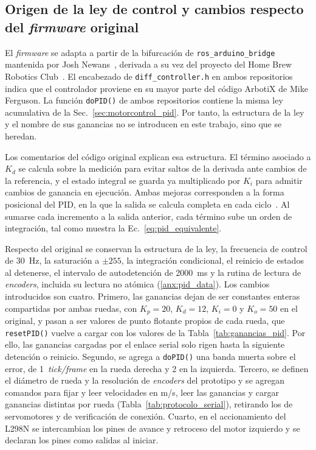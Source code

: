 \begin{appendices}
\subsection{Origen de la ley de control y cambios respecto del \texorpdfstring{\textit{firmware}}{firmware} original}
\label{anx:pid_origen}

El \textit{firmware} se adapta a partir de la bifurcación de
\texttt{ros\_arduino\_bridge} mantenida por Josh
Newans~\citep{newans_rosarduinobridge}, derivada a su vez del proyecto del
Home Brew Robotics Club~\citep{hbrobotics_rosarduinobridge}. El encabezado de
\texttt{diff\_controller.h} en ambos repositorios indica que el controlador
proviene en su mayor parte del código ArbotiX de Mike Ferguson. La función
\texttt{doPID()} de ambos repositorios contiene la misma ley acumulativa de la
Sec.~\ref{sec:motorcontrol_pid}. Por tanto, la estructura de la ley y el nombre
de sus ganancias no se introducen en este trabajo, sino que se heredan.

Los comentarios del código original explican esa estructura. El término
asociado a $K_d$ se calcula sobre la medición para evitar saltos de la
derivada ante cambios de la referencia, y el estado integral se guarda ya
multiplicado por $K_i$ para admitir cambios de ganancia en ejecución. Ambas
mejoras corresponden a la forma posicional del PID, en la que la salida se
calcula completa en cada ciclo~\citep[Sec.~13.4]{astrom2009controlpid}. Al sumarse cada incremento a la salida
anterior, cada término sube un orden de integración, tal como muestra la
Ec.~\eqref{eq:pid_equivalente}.

Respecto del original se conservan la estructura de la ley, la frecuencia de
control de 30~Hz, la saturación a $\pm255$, la integración condicional, el
reinicio de estados al detenerse, el intervalo de autodetención de 2000~ms y
la rutina de lectura de \textit{encoders}, incluida su lectura no atómica
(\ref{anx:pid_data}). Los cambios introducidos son cuatro. Primero, las
ganancias dejan de ser constantes enteras compartidas por ambas ruedas, con
$K_p=20$, $K_d=12$, $K_i=0$ y $K_o=50$ en el original, y pasan a ser valores
de punto flotante propios de cada rueda, que \texttt{resetPID()} vuelve a
cargar con los valores de la Tabla~\ref{tab:ganancias_pid}. Por ello, las
ganancias cargadas por el enlace serial solo rigen hasta la siguiente
detención o reinicio. Segundo, se agrega a \texttt{doPID()} una banda muerta
sobre el error, de 1~\textit{tick/frame} en la rueda derecha y 2 en la izquierda.
Tercero, se definen el diámetro de rueda y la resolución de \textit{encoders} del
prototipo y se agregan comandos para fijar y leer velocidades en m/s, leer
las ganancias y cargar ganancias distintas por rueda
(Tabla~\ref{tab:protocolo_serial}), retirando los de servomotores y de
verificación de conexión. Cuarto, en el accionamiento del L298N se
intercambian los pines de avance y retroceso del motor izquierdo y se
declaran los pines como salidas al iniciar.


\end{appendices}
